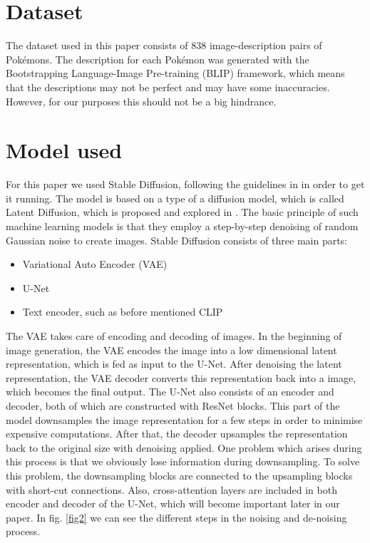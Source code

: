\documentclass[conference]{IEEEtran}
\begin{document}
\section{Dataset}
The dataset used in this paper \cite{pinkney2022pokemon} consists of 838 image-description pairs of Pokémons. The description for each Pokémon was generated with the Bootstrapping Language-Image Pre-training (BLIP) framework, which means that the descriptions may not be perfect and may have some inaccuracies. However, for our purposes this should not be a big hindrance.

\section{Model used}
For this paper we used Stable Diffusion, following the guidelines in \cite{patil2022stable} in order to get it running. The model is based on a type of a diffusion model, which is called Latent Diffusion, which is proposed and explored in \cite{diffus}. The basic principle of such machine learning models is that they employ a step-by-step denoising of random Gaussian noise to create images. Stable Diffusion consists of three main parts:
\begin{itemize}
\item Variational Auto Encoder (VAE)
\item U-Net
\item Text encoder, such as before mentioned CLIP
\end{itemize}
The VAE takes care of encoding and decoding of images. In the beginning of image generation, the VAE encodes the image into a low dimensional latent representation, which is fed as input to the U-Net. After denoising the latent representation, the VAE decoder converts this representation back into a image, which becomes the final output. The U-Net also consists of an encoder and decoder, both of which are constructed with ResNet blocks. This part of the model downsamples the image representation for a few steps in order to minimise expensive computations. After that, the decoder upsamples the representation back to the original size with denoising applied. One problem which arises during this process is that we obviously lose information during downsampling. To solve this problem, the downsampling blocks are connected to the upsampling blocks with short-cut connections. Also, cross-attention layers are included in both encoder and decoder of the U-Net, which will become important later in our paper. In fig. \ref{fig2} we can see the different steps in the noising and de-noising process.
\end{document}
